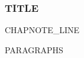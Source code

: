 %
%

\begin{frame}
  \frametitle{{{TITLE}}}
  {{CHAPNOTE_LINE}}
  \vskip0.15cm

  {{PARAGRAPHS}}
\end{frame}

